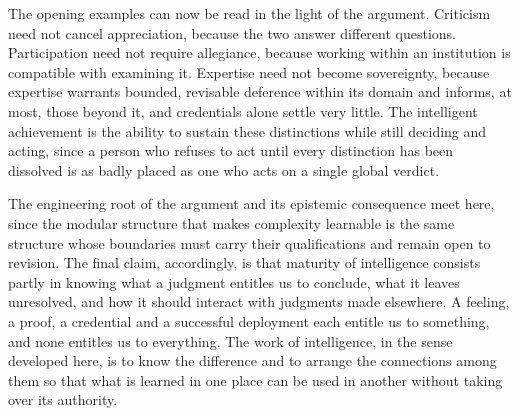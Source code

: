 \documentclass[12pt, a4paper]{article}
\begin{document}
The opening examples can now be read in the light of the argument. Criticism need not cancel appreciation, because the two answer different questions. Participation need not require allegiance, because working within an institution is compatible with examining it. Expertise need not become sovereignty, because expertise warrants bounded, revisable deference within its domain and informs, at most, those beyond it, and credentials alone settle very little. The intelligent achievement is the ability to sustain these distinctions while still deciding and acting, since a person who refuses to act until every distinction has been dissolved is as badly placed as one who acts on a single global verdict.

The engineering root of the argument and its epistemic consequence meet here, since the modular structure that makes complexity learnable is the same structure whose boundaries must carry their qualifications and remain open to revision. The final claim, accordingly, is that maturity of intelligence consists partly in knowing what a judgment entitles us to conclude, what it leaves unresolved, and how it should interact with judgments made elsewhere. A feeling, a proof, a credential and a successful deployment each entitle us to something, and none entitles us to everything. The work of intelligence, in the sense developed here, is to know the difference and to arrange the connections among them so that what is learned in one place can be used in another without taking over its authority.
\end{document}
